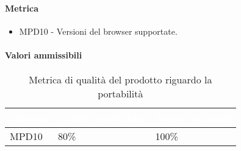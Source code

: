 \paragraph{Metrica}
\begin{itemize}
\item MPD10 - Versioni del browser supportate.
\end{itemize}
\paragraph{Valori ammissibili}
\renewcommand{\arraystretch}{1.5}
\begin{longtable}{C{2.5cm} C{4cm} C{4cm}}
\textcolor{white}{\textbf{Metrica}}&
\textcolor{white}{\textbf{Valore accettabile}}&
\textcolor{white}{\textbf{Valore ottimale}}\\	
\endhead
\endfoot
{}\caption{Metrica di qualità del prodotto riguardo la portabilità}
\endlastfoot
		MPD10 &  
		80\% &
		100\% \\
\end{longtable}